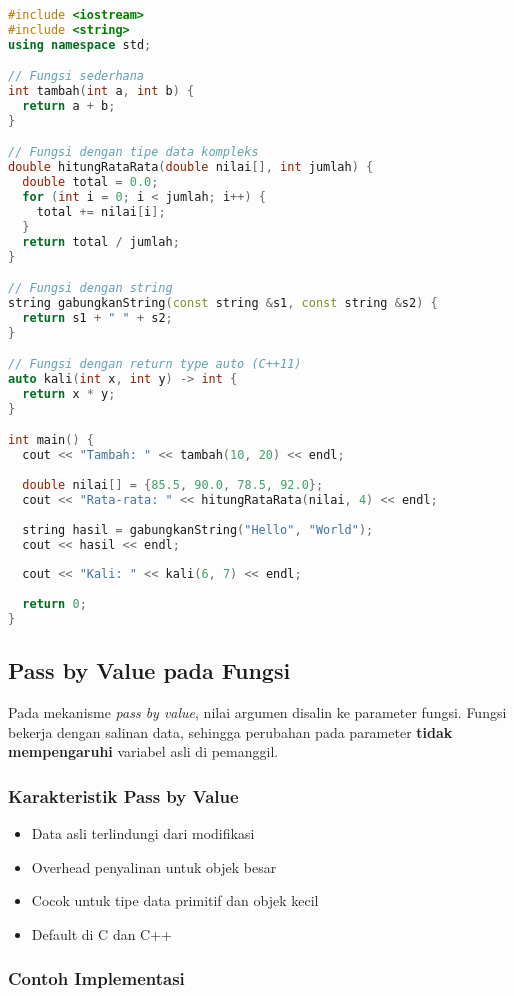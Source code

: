 \documentclass[../main.tex]{subfiles}
\begin{document}
\begin{lstlisting}[language=C++, caption={Deklarasi dan definisi fungsi (C++)}]
#include <iostream>
#include <string>
using namespace std;

// Fungsi sederhana
int tambah(int a, int b) {
  return a + b;
}

// Fungsi dengan tipe data kompleks
double hitungRataRata(double nilai[], int jumlah) {
  double total = 0.0;
  for (int i = 0; i < jumlah; i++) {
    total += nilai[i];
  }
  return total / jumlah;
}

// Fungsi dengan string
string gabungkanString(const string &s1, const string &s2) {
  return s1 + " " + s2;
}

// Fungsi dengan return type auto (C++11)
auto kali(int x, int y) -> int {
  return x * y;
}

int main() {
  cout << "Tambah: " << tambah(10, 20) << endl;
  
  double nilai[] = {85.5, 90.0, 78.5, 92.0};
  cout << "Rata-rata: " << hitungRataRata(nilai, 4) << endl;
  
  string hasil = gabungkanString("Hello", "World");
  cout << hasil << endl;
  
  cout << "Kali: " << kali(6, 7) << endl;
  
  return 0;
}
\end{lstlisting}

\subsection{Pass by Value pada Fungsi}
Pada mekanisme \emph{pass by value}, nilai argumen disalin ke parameter fungsi. Fungsi bekerja dengan salinan data, sehingga perubahan pada parameter \textbf{tidak mempengaruhi} variabel asli di pemanggil.

\subsubsection{Karakteristik Pass by Value}
\begin{itemize}
  \item Data asli terlindungi dari modifikasi
  \item Overhead penyalinan untuk objek besar
  \item Cocok untuk tipe data primitif dan objek kecil
  \item Default di C dan C++
\end{itemize}

\subsubsection{Contoh Implementasi}
\end{document}
